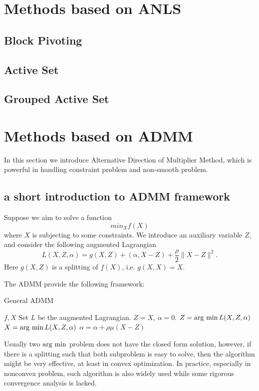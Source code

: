 \documentclass{article}
\begin{document}
\section{Methods based on ANLS}

\subsection{Block Pivoting}

\subsection{Active Set}

\subsection{Grouped Active Set}

\section{Methods based on ADMM}
In this section we introduce Alternative Direction of Multiplier Method, which is powerful in handling constraint problem and non-smooth problem.
\subsection{a short introduction to ADMM framework}
Suppose we aim to solve a function 
$$min_X f(X)$$
where $X$ is subjecting to some constraints. We introduce an auxiliary variable $Z$, and consider the following augmented Lagrangian
$$L(X,Z,\alpha) = g(X,Z) + (\alpha, X-Z) + \frac{\rho}{2} \|X-Z\|^2.$$
Here $g(X,Z)$ is a splitting of $f(X)$, i.e. $g(X,X) = X$.

The ADMM provide the following framework:
\begin{algorithm}
	\caption{General ADMM}
	\begin{algorithmic}[1]
	\REQUIRE $f, X$
	\STATE Set $L$ be the augmented Lagrangian.
	\STATE $Z = X$, $\alpha = 0$.
	\STATE $Z = \operatorname{arg~min} L(X,Z,\alpha)$
	\STATE $X = \operatorname{arg~min} L(X,Z,\alpha)$
	\STATE $\alpha = \alpha + \rho\mu(X-Z)$
	\ENDWHILE
	\end{algorithmic}
\end{algorithm}
Usually two $\operatorname{arg~min}$ problem does not have the closed form solution, however, if there is a splitting such that both subproblem is easy to solve, then the algorithm might be very effective, at least in convex optimization. In practice, especially in nonconvex problem, such algorithm is also widely used while some rigorous convergence analysis is lacked.
\end{document}
